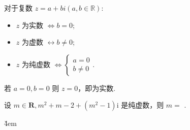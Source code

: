 \begin{definition}[复数的分类]
    \begin{minipage}{0.4\textwidth}
        对于复数 $z=a+bi(a,b\in \mathbb{R})$:
        \begin{itemize}
            \item $z$ 为实数 $\Leftrightarrow b=0$;
            \item $z$ 为虚数 $\leftrightarrow b \ne 0$;
            \item $z$ 为纯虚数 $\Leftrightarrow \begin{cases}a=0\\ b\ne0\end{cases}.$
        \end{itemize}
    \end{minipage}
    \begin{minipage}{0.58\textwidth}
        \begin{warning}
            若 $a=0,b=0$ 则 $z= 0$，即为实数.
        \end{warning}
    \end{minipage}
\end{definition}

\begin{example}
    设 $m \in \mathbf{R}, m^2+m-2+\left(m^2-1\right) \mathrm{i}$ 是纯虚数，则 $m=$ \underline{\qquad}.
\end{example}

\v{4em}
